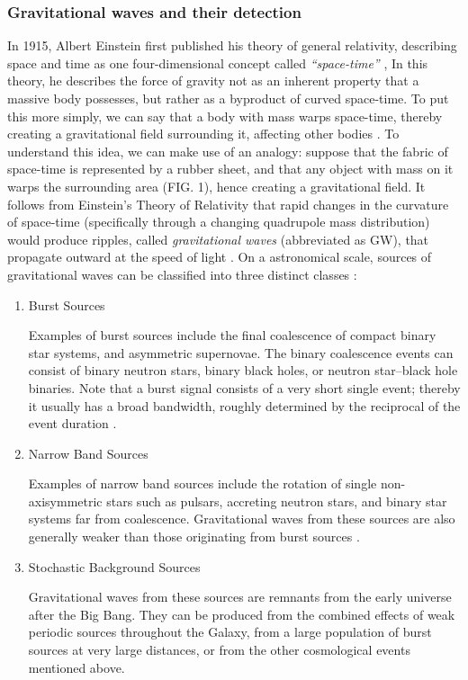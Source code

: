 \documentclass[preprint,
letterpaper,
 amsmath,amssymb,
 aps,
]{revtex4-2}
\begin{document}
\subsubsection{Gravitational waves and their detection}
In 1915, Albert Einstein first published his theory of general relativity, describing space and time as one four-dimensional concept called \textit{``space-time''} \cite{maggiore_2008}, In this theory, he describes the force of gravity not as an inherent property that a massive body possesses, but rather as a byproduct of curved space-time. To put this more simply, we can say that a body with mass warps space-time, thereby creating a gravitational field surrounding it, affecting other bodies \cite{carlip}. To understand this idea, we can make use of an analogy: suppose that the fabric of space-time is represented by a rubber sheet, and that any object with mass on it warps the surrounding area (FIG. 1), hence creating a gravitational field. It follows from Einstein's Theory of Relativity that rapid changes in the curvature of space-time (specifically through a changing quadrupole mass distribution) would produce ripples, called \textit{gravitational waves} (abbreviated as GW), that propagate outward at the speed of light  \cite{JSTORLIGO}. On a astronomical scale, sources of gravitational waves can be classified into three distinct classes \cite{blair_howell_ju_zhao_2012}: 

\begin{enumerate}
\item Burst Sources

Examples of burst sources include the final coalescence of compact binary star systems, and asymmetric supernovae. The binary coalescence events can consist of binary neutron stars, binary black holes, or neutron star–black hole
binaries. Note that a burst signal consists of a very short single event; thereby it usually has a broad bandwidth, roughly determined by the
reciprocal of the event duration \cite{blair_howell_ju_zhao_2012}.
\item Narrow Band Sources

Examples of narrow band sources include the rotation of single non-axisymmetric stars such as pulsars, accreting neutron stars, and binary star systems far from coalescence. Gravitational waves from these sources are also generally weaker than those originating from burst sources \cite{blair_howell_ju_zhao_2012}.
\item Stochastic Background Sources

Gravitational waves from these sources are remnants from the early universe after the Big Bang. They can be produced from the combined effects of weak periodic sources throughout the Galaxy, from a large population of burst sources at very large distances, or from the other cosmological events mentioned above.
\end{enumerate}
\end{document}
